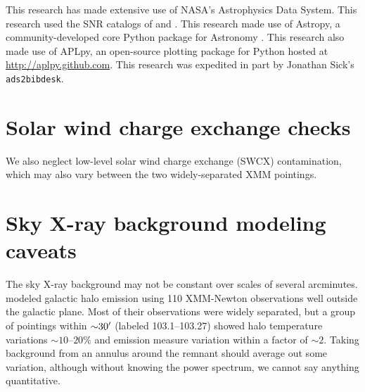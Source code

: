\documentclass[twocolumn,tighten,trackchanges]{aastex61}
\newcommand*{\abt}{\mathord{\sim}} %
\begin{document}
This research has made extensive use of NASA's Astrophysics Data System.
This research used the SNR catalogs of \citet{ferrand2012} and
\citet{green2014}.
This research made use of Astropy, a community-developed core Python package
for Astronomy \citep{astropy2013}.
This research also made use of APLpy, an open-source plotting package for
Python hosted at \url{http://aplpy.github.com}.
This research was expedited in part by Jonathan Sick's \texttt{ads2bibdesk}.






\clearpage  %
\appendix

\setcounter{table}{0}
\renewcommand{\thetable}{A\arabic{table}}
\setcounter{figure}{0}
\renewcommand{\thefigure}{A\arabic{figure}}

\section{Solar wind charge exchange checks}

We also neglect low-level solar wind charge exchange (SWCX) contamination,
which may also vary between the two widely-separated XMM pointings.


\section{Sky X-ray background modeling caveats}

The sky X-ray background may not be constant over scales of several arcminutes.
\citet{henley2013} modeled galactic halo emission using 110 XMM-Newton
observations well outside the galactic plane.
Most of their observations were widely separated, but a group of pointings
within $\abt 30\arcmin$ (labeled 103.1--103.27) showed halo temperature
variations $\abt 10$--$20\%$ and emission measure variation within a factor of
$\abt 2$.
Taking background from an annulus around the remnant should average out some
variation, although without knowing the power spectrum, we cannot say anything
quantitative.
\end{document}
